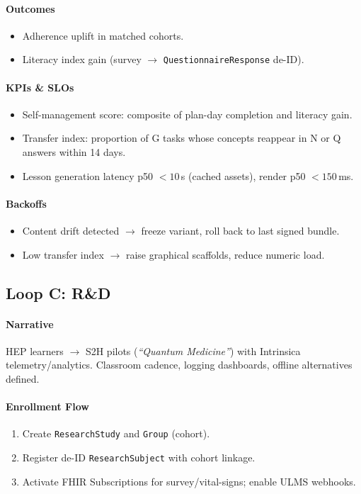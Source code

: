 \documentclass[11pt]{article}
\theoremstyle{plain}
\begin{document}
\paragraph{Outcomes}
\begin{itemize}
  \item Adherence uplift in matched cohorts.
  \item Literacy index gain (survey $\rightarrow$ \texttt{QuestionnaireResponse} de-ID).
\end{itemize}

\paragraph{KPIs \& SLOs}
\begin{itemize}
  \item Self-management score: composite of plan-day completion and literacy gain.
  \item Transfer index: proportion of G tasks whose concepts reappear in N or Q answers within 14 days.
  \item Lesson generation latency p50 $<10$\,s (cached assets), render p50 $<150$\,ms.
\end{itemize}

\paragraph{Backoffs}
\begin{itemize}
  \item Content drift detected $\rightarrow$ freeze variant, roll back to last signed bundle.
  \item Low transfer index $\rightarrow$ raise graphical scaffolds, reduce numeric load.
\end{itemize}

\bigskip
\subsection{Loop C: R\&D}\label{sec:loop-rnd}

\paragraph{Narrative}
HEP learners $\rightarrow$ S2H pilots (\emph{``Quantum Medicine''}) with Intrinsica telemetry/analytics. Classroom cadence, logging dashboards, offline alternatives defined.

\paragraph{Enrollment Flow}
\begin{enumerate}
  \item Create \texttt{ResearchStudy} and \texttt{Group} (cohort).
  \item Register de-ID \texttt{ResearchSubject} with cohort linkage.
  \item Activate FHIR Subscriptions for survey/vital-signs; enable ULMS webhooks.
\end{enumerate}
\end{document}
